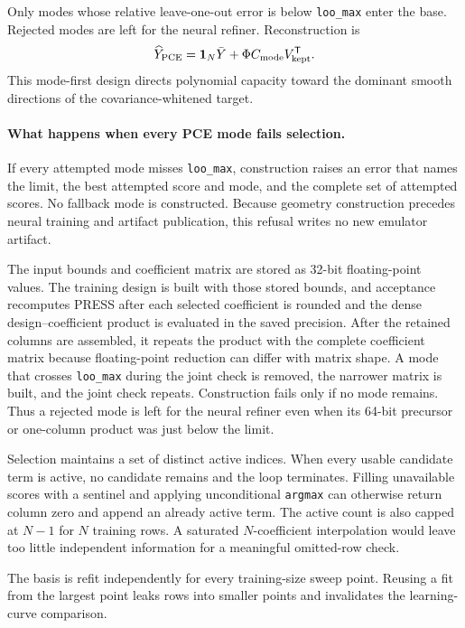 \documentclass[10pt,aps,prd,twocolumn,nofootinbib]{revtex4-2}
\newcommand{\code}[1]{\texttt{#1}}
\begin{document}
Only modes whose relative leave-one-out error is below \code{loo\_max} enter
the base.  Rejected modes are left for the neural refiner.  Reconstruction is
\begin{equation*}
 \widehat Y_{\rm PCE}
 =\mathbf 1_N\bar Y+\Phi C_{\rm mode}V_{\rm kept}^{\mathsf T}.
\end{equation*}
This mode-first design directs polynomial capacity toward the dominant smooth
directions of the covariance-whitened target.

\paragraph{What happens when every PCE mode fails selection.}
If every attempted mode misses \code{loo\_max}, construction raises an error
that names the limit, the best attempted score and mode, and the complete set
of attempted scores.  No fallback mode is constructed.  Because geometry
construction precedes neural training and artifact publication, this refusal
writes no new emulator artifact.

The input bounds and coefficient matrix are stored as 32-bit floating-point
values.  The training design is built with those stored bounds, and acceptance
recomputes PRESS after each selected coefficient is rounded and the dense
design--coefficient product is evaluated in the saved precision.  After the
retained columns are assembled, it repeats the product with the complete
coefficient matrix because floating-point reduction can differ with matrix
shape.  A mode that crosses \code{loo\_max} during the joint check is removed,
the narrower matrix is built, and the joint check repeats.  Construction fails
only if no mode remains.  Thus a rejected mode is left for the neural refiner
even when its 64-bit precursor or one-column product was just below the limit.

Selection maintains a set of distinct active indices.  When every usable
candidate term is active, no candidate remains and the loop terminates.
Filling unavailable scores with a sentinel and applying unconditional
\code{argmax} can otherwise return column zero and append an already active
term.
The active count is also capped at $N-1$ for $N$ training rows.  A saturated
$N$-coefficient interpolation would leave too little independent information
for a meaningful omitted-row check.

The basis is refit independently for every training-size sweep point.  Reusing
a fit from the largest point leaks rows into smaller points and invalidates
the learning-curve comparison.
\end{document}
